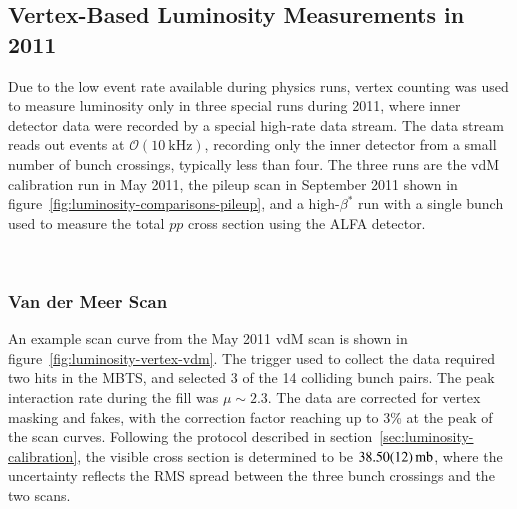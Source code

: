 \subsection{Vertex-Based Luminosity Measurements in 2011}
Due to the low event rate available during physics runs, vertex counting was used to measure luminosity only in three special runs during 2011, where inner detector data were recorded by a special high-rate data stream. The data stream reads out events at $\mathcal{O}(\SI{10}{\kilo\hertz})$, recording only the inner detector from a small number of bunch crossings, typically less than four. The three runs are the vdM calibration run in May 2011, the pileup scan in September 2011 shown in figure~\ref{fig:luminosity-comparisons-pileup}, and a high-$\beta^{*}$ run with a single bunch used to measure the total $pp$ cross section using the ALFA detector. 

\ 

\subsubsection{Van der Meer Scan}

An example scan curve from the May 2011 vdM scan is shown in figure~\ref{fig:luminosity-vertex-vdm}. The trigger used to collect the data required two hits in the MBTS, and selected 3 of the 14 colliding bunch pairs. The peak interaction rate during the fill was $\mu\sim2.3$. The data are corrected for vertex masking and fakes, with the correction factor reaching up to 3\% at the peak of the scan curves. Following the protocol described in section~\ref{sec:luminosity-calibration}, the visible cross section is determined to be $\SI{38.5\pm 0.12}{\milli\barn}$, where the uncertainty reflects the RMS spread between the three bunch crossings and the two scans.

